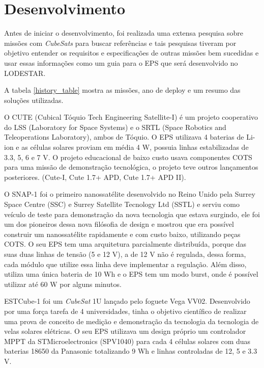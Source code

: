 \chapter{Desenvolvimento} \label{desenvolvimento}

Antes de iniciar o desenvolvimento, foi realizada uma extensa pesquisa sobre missões com \textit{CubeSats} para buscar referências e tais pesquisas tiveram por objetivo entender os requisitos e especificações de outras missões bem sucedidas e usar essas informações como um guia para o EPS que será desenvolvido no LODESTAR. 

A tabela \ref{history_table} mostra as missões, ano de deploy e um resumo das soluções utilizadas.



O CUTE \cite{cute1_ref} (Cubical  Tóquio  Tech  Engineering  Satellite-I) é um projeto cooperativo do LSS (Laboratory for Space Systems) e o SRTL (Space Robotics and Teleoperations Laboratory), ambos de Tóquio. O EPS utilizava 4 baterias de Li-ion e as células solares proviam em média 4 W, possuia linhas estabilizadas de 3.3, 5, 6 e 7 V. O  projeto  educacional  de  baixo  custo  usava componentes COTS para uma missão de demonstração tecnológica, o projeto teve outros lançamentos posteriores. (Cute-I, Cute 1.7+ APD, Cute 1.7+ APD II). 

O SNAP-1 \cite{snap1_ref} foi o primeiro nanossatélite desenvolvido no Reino Unido pela Surrey Space Centre (SSC) e Surrey Satellite Tecnology Ltd (SSTL) e serviu como veículo de teste para demonstração da nova tecnologia que estava surgindo, ele foi um dos pioneiros dessa nova filósofia de design e mostrou que era possível construir um nanossatélite rapidamente e com custo baixo, utilizando peças COTS. O seu EPS tem uma arquitetura parcialmente distribuída, porque das suas duas linhas de tensão (5 e 12 V), a de 12 V não é regulada, dessa forma, cada módulo que utilize essa linha deve implementar a regulação. Além disso, utiliza uma única bateria de 10 Wh e o EPS tem um modo burst, onde é possível utilizar até 60 W por alguns minutos.

ESTCube-1 \cite{estcube1_ref} foi um \textit{CubeSat} 1U lançado pelo foguete Vega VV02. Desenvolvido por uma força tarefa de 4 universidades, tinha o objetivo científico de realizar uma prova de conceito de medição e demonstração da tecnologia da tecnologia de velas solares elétricas. O seu EPS utilizava um design próprio um controlador MPPT da STMicroelectronics (SPV1040) para cada 4 células solares com duas baterias 18650 da Panasonic totalizando 9 Wh e linhas controladas de 12, 5 e 3.3 V.

